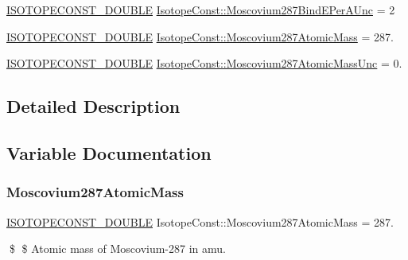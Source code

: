 \begin{DoxyCompactItemize}
\mbox{\hyperlink{group___isotope_const-_macros_ga8f45a7272ce02c0b4c65c44636ed719a}{I\+S\+O\+T\+O\+P\+E\+C\+O\+N\+S\+T\+\_\+\+D\+O\+U\+B\+LE}} \mbox{\hyperlink{group___isotope_const-_moscovium-_mc287_ga9c03020514dd0c78b4bac49212ce0486}{Isotope\+Const\+::\+Moscovium287\+Bind\+E\+Per\+A\+Unc}} = 2
\item 
\mbox{\hyperlink{group___isotope_const-_macros_ga8f45a7272ce02c0b4c65c44636ed719a}{I\+S\+O\+T\+O\+P\+E\+C\+O\+N\+S\+T\+\_\+\+D\+O\+U\+B\+LE}} \mbox{\hyperlink{group___isotope_const-_moscovium-_mc287_gaf29409086c1a9ced2539c9a3894ba4ca}{Isotope\+Const\+::\+Moscovium287\+Atomic\+Mass}} = 287.
\item 
\mbox{\hyperlink{group___isotope_const-_macros_ga8f45a7272ce02c0b4c65c44636ed719a}{I\+S\+O\+T\+O\+P\+E\+C\+O\+N\+S\+T\+\_\+\+D\+O\+U\+B\+LE}} \mbox{\hyperlink{group___isotope_const-_moscovium-_mc287_ga79ee90074d14d24f2169992ae782c933}{Isotope\+Const\+::\+Moscovium287\+Atomic\+Mass\+Unc}} = 0.
\end{DoxyCompactItemize}


\subsection{Detailed Description}


\subsection{Variable Documentation}
\mbox{\label{group___isotope_const-_moscovium-_mc287_gaf29409086c1a9ced2539c9a3894ba4ca}} 
\subsubsection{\texorpdfstring{Moscovium287\+Atomic\+Mass}{Moscovium287AtomicMass}}
{\footnotesize\ttfamily \mbox{\hyperlink{group___isotope_const-_macros_ga8f45a7272ce02c0b4c65c44636ed719a}{I\+S\+O\+T\+O\+P\+E\+C\+O\+N\+S\+T\+\_\+\+D\+O\+U\+B\+LE}} Isotope\+Const\+::\+Moscovium287\+Atomic\+Mass = 287.}

\$ \$ Atomic mass of Moscovium-\/287 in amu. \mbox{\label{group___isotope_const-_moscovium-_mc287_ga79ee90074d14d24f2169992ae782c933}} 
